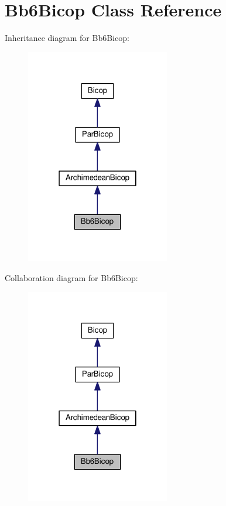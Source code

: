\hypertarget{class_bb6_bicop}{}\section{Bb6\+Bicop Class Reference}
\label{class_bb6_bicop}


Inheritance diagram for Bb6\+Bicop\+:\nopagebreak
\begin{figure}[H]
\begin{center}
\leavevmode
\includegraphics[width=178pt]{class_bb6_bicop__inherit__graph}
\end{center}
\end{figure}


Collaboration diagram for Bb6\+Bicop\+:\nopagebreak
\begin{figure}[H]
\begin{center}
\leavevmode
\includegraphics[width=178pt]{class_bb6_bicop__coll__graph}
\end{center}
\end{figure}
